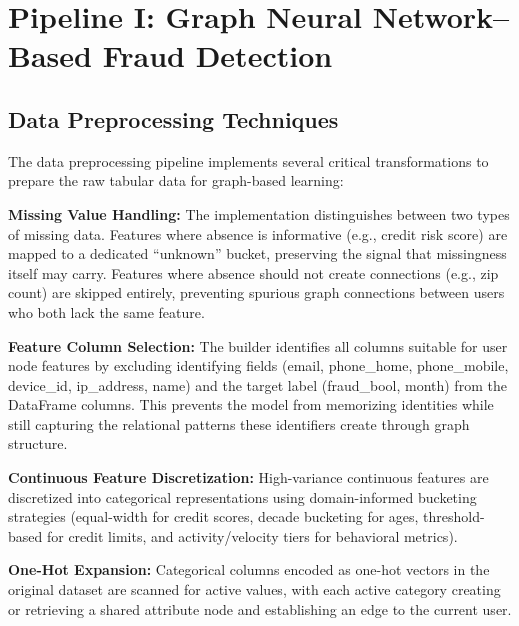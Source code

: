 \chapter{Pipeline I: Graph Neural Network--Based Fraud Detection}
\label{ch:gnn}

\newcommand{\tablestrut}{\renewcommand{\arraystretch}{1.18}}

\section{Data Preprocessing Techniques}

The data preprocessing pipeline implements several critical transformations to prepare the raw tabular data for graph-based learning:

\textbf{Missing Value Handling:} The implementation distinguishes between two types of missing data. Features where absence is informative (e.g., credit risk score) are mapped to a dedicated ``unknown'' bucket, preserving the signal that missingness itself may carry. Features where absence should not create connections (e.g., zip count) are skipped entirely, preventing spurious graph connections between users who both lack the same feature.

\textbf{Feature Column Selection:} The builder identifies all columns suitable for user node features by excluding identifying fields (email, phone\_home, phone\_mobile, device\_id, ip\_address, name) and the target label (fraud\_bool, month) from the DataFrame columns. This prevents the model from memorizing identities while still capturing the relational patterns these identifiers create through graph structure.

\textbf{Continuous Feature Discretization:} High-variance continuous features are discretized into categorical representations using domain-informed bucketing strategies (equal-width for credit scores, decade bucketing for ages, threshold-based for credit limits, and activity/velocity tiers for behavioral metrics).

\textbf{One-Hot Expansion:} Categorical columns encoded as one-hot vectors in the original dataset are scanned for active values, with each active category creating or retrieving a shared attribute node and establishing an edge to the current user.


